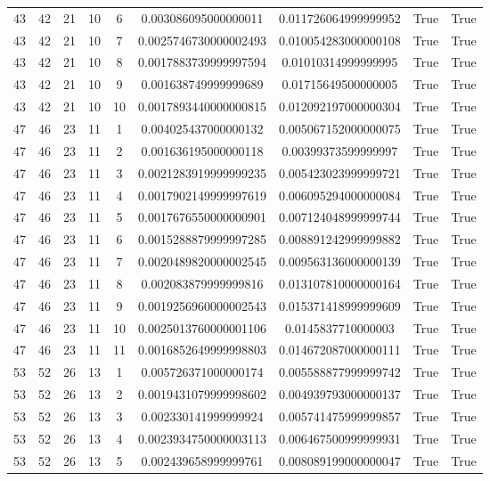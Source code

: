 \documentclass[a4paper,11pt]{article}
\begin{document}
\begin{landscape}
\begin{longtable}{ccccccccc}
43 & 42 & 21 & 10 & 6 & 0.003086095000000011 & 0.011726064999999952 & True & True \\
43 & 42 & 21 & 10 & 7 & 0.0025746730000002493 & 0.010054283000000108 & True & True \\
43 & 42 & 21 & 10 & 8 & 0.0017883739999997594 & 0.01010314999999995 & True & True \\
43 & 42 & 21 & 10 & 9 & 0.001638749999999689 & 0.01715649500000005 & True & True \\
43 & 42 & 21 & 10 & 10 & 0.0017893440000000815 & 0.012092197000000304 & True & True \\
47 & 46 & 23 & 11 & 1 & 0.004025437000000132 & 0.005067152000000075 & True & True \\
47 & 46 & 23 & 11 & 2 & 0.001636195000000118 & 0.00399373599999997 & True & True \\
47 & 46 & 23 & 11 & 3 & 0.0021283919999999235 & 0.005423023999999721 & True & True \\
47 & 46 & 23 & 11 & 4 & 0.0017902149999997619 & 0.006095294000000084 & True & True \\
47 & 46 & 23 & 11 & 5 & 0.0017676550000000901 & 0.007124048999999744 & True & True \\
47 & 46 & 23 & 11 & 6 & 0.0015288879999997285 & 0.008891242999999882 & True & True \\
47 & 46 & 23 & 11 & 7 & 0.0020489820000002545 & 0.009563136000000139 & True & True \\
47 & 46 & 23 & 11 & 8 & 0.002083879999999816 & 0.013107810000000164 & True & True \\
47 & 46 & 23 & 11 & 9 & 0.0019256960000002543 & 0.015371418999999609 & True & True \\
47 & 46 & 23 & 11 & 10 & 0.0025013760000001106 & 0.0145837710000003 & True & True \\
47 & 46 & 23 & 11 & 11 & 0.0016852649999998803 & 0.014672087000000111 & True & True \\
53 & 52 & 26 & 13 & 1 & 0.005726371000000174 & 0.005588877999999742 & True & True \\
53 & 52 & 26 & 13 & 2 & 0.0019431079999998602 & 0.004939793000000137 & True & True \\
53 & 52 & 26 & 13 & 3 & 0.002330141999999924 & 0.005741475999999857 & True & True \\
53 & 52 & 26 & 13 & 4 & 0.0023934750000003113 & 0.006467500999999931 & True & True \\
53 & 52 & 26 & 13 & 5 & 0.002439658999999761 & 0.008089199000000047 & True & True \\

\end{longtable}
\end{landscape}
\end{document}
